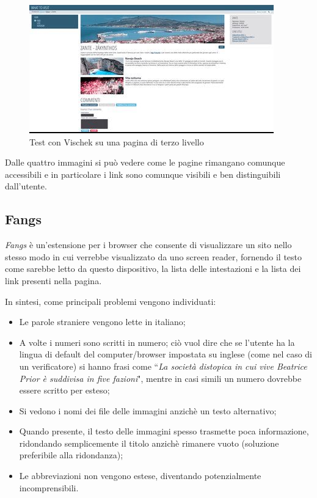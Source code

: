 \begin{figure}[H]
\begin{minipage}{0.45\textwidth}
\end{minipage}
\hspace{\fill}
\begin{minipage}{0.45\textwidth}
\includegraphics[width=\linewidth]{images/screen/tritanope.jpg}
\end{minipage}
\caption{Test con Vischek su una pagina di terzo livello}\label{multiavp}
\end{figure}

Dalle quattro immagini si può vedere come le pagine rimangano comunque accessibili e
in particolare i link sono comunque visibili e ben distinguibili dall'utente.

\subsection{Fangs}\label{sec:fangs}
\textit{Fangs} è un'estensione per i browser che consente di visualizzare un
sito nello stesso modo in cui verrebbe visualizzato da uno screen reader,
fornendo il testo come sarebbe letto da questo dispositivo, la lista delle
intestazioni e la lista dei link presenti nella pagina.

In sintesi, come principali problemi vengono individuati:
\begin{itemize}
\item Le parole straniere vengono lette in italiano;
\item A volte i numeri sono scritti in numero; ciò vuol dire che se l'utente
ha la lingua di default del computer/browser impostata su inglese (come nel
caso di un verificatore) si hanno frasi come ``\textit{La società distopica in
cui vive Beatrice Prior è suddivisa in five fazioni}", mentre in casi simili
un numero dovrebbe essere scritto per esteso;
\item Si vedono i nomi dei file delle immagini anzichè un testo alternativo;
\item Quando presente, il testo delle immagini spesso trasmette poca
informazione, ridondando semplicemente il titolo anzichè rimanere vuoto
(soluzione preferibile alla ridondanza);
\item Le abbreviazioni non vengono estese, diventando potenzialmente
incomprensibili.
\end{itemize}

